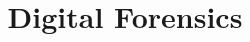 \documentclass[theme=sleek, randomorder, hidesidemenu]{webquiz}
\title{Digital Forensics}
\begin{document}
\begin{quizindex}
\end{quizindex}
\end{document}
